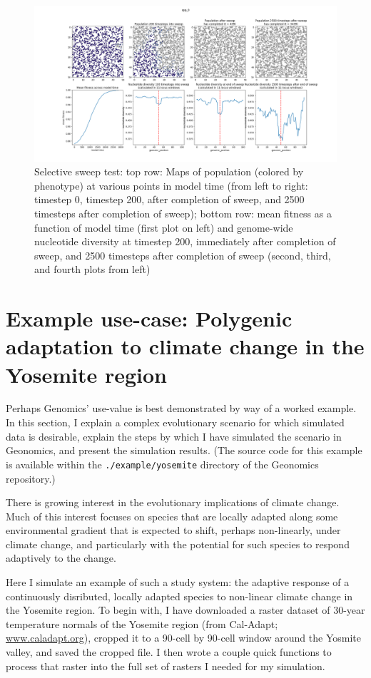 ﻿\documentclass{article}
\begin{document}
\begin{figure}[h!]
\includegraphics[width=175mm]{./img/validation/sweep/sweep_results.png}
        \caption{Selective sweep test: top row: Maps of population (colored by phenotype) at various points in model time (from left to right: timestep 0, timestep 200, after completion of sweep, and 2500 timesteps after completion of sweep); bottom row: mean fitness as a function of model time (first plot on left) and genome-wide nucleotide diversity at timestep 200, immediately after completion of sweep, and 2500 timesteps after completion of sweep (second, third, and fourth plots from left)}
\end{figure}


\section{Example use-case: Polygenic adaptation to climate change in the Yosemite region}

Perhaps Genomics' use-value is best demonstrated by way of a worked example.
In this section, I explain a complex evolutionary scenario for which 
simulated data is desirable, explain the steps by which I have simulated the
scenario in Geonomics, and present the simulation results. (The source code for
this example is available within the \texttt{./example/yosemite} directory
of the Geonomics repository.)

There is growing interest in the evolutionary implications of climate change.
Much of this interest focuses on species that are locally adapted along some
environmental gradient that is expected to shift, perhaps non-linearly,
under climate change, and particularly with the potential for such species
to respond adaptively to the change.

Here I simulate an example of such a study system: the adaptive
response of a continuously disributed, locally adapted species
to non-linear climate change in the Yosemite region. To begin with, I have
downloaded a raster dataset of 30-year temperature normals of the Yosemite
region (from Cal-Adapt; \url{www.caladapt.org}), cropped it to a 90-cell by
90-cell window around the Yosmite valley, and saved the cropped file. I then
wrote a couple quick functions to process that raster into the full set of
rasters I needed for my simulation.
\end{document}
